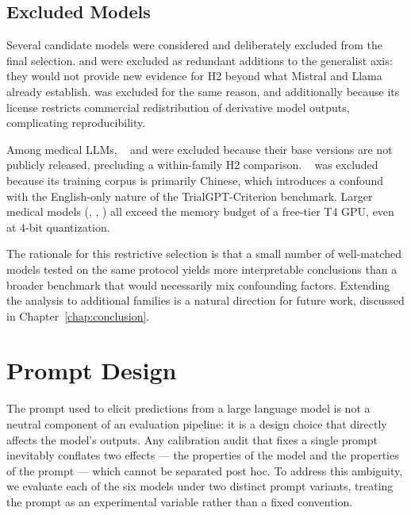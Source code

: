 \subsection{Excluded Models}
\label{subsec:met-excluded}

Several candidate models were considered and deliberately excluded from the 
final selection.  and  were 
excluded as redundant additions to the generalist axis: they would not 
provide new evidence for H2 beyond what Mistral and Llama already establish. 
 was excluded for the same reason, and additionally 
because its license restricts commercial redistribution of derivative 
model outputs, complicating reproducibility.

Among medical LLMs, ~\cite{christophe2024med42} and 
 were excluded because their base versions are not 
publicly released, precluding a within-family H2 comparison. 
~\cite{chen2024huatuogpt} was excluded because its 
training corpus is primarily Chinese, which introduces a confound with the 
English-only nature of the TrialGPT-Criterion benchmark. Larger medical 
models (, , ) all 
exceed the memory budget of a free-tier T4 GPU, even at 4-bit quantization.

The rationale for this restrictive selection is that a small number of 
well-matched models tested on the same protocol yields more interpretable 
conclusions than a broader benchmark that would necessarily mix confounding 
factors. Extending the analysis to additional families is a natural 
direction for future work, discussed in Chapter~\ref{chap:conclusion}.
\section{Prompt Design}
\label{sec:met-prompts}

The prompt used to elicit predictions from a large language model is not a 
neutral component of an evaluation pipeline: it is a design choice that 
directly affects the model's outputs. Any calibration audit that fixes a 
single prompt inevitably conflates two effects --- the properties of the 
model and the properties of the prompt --- which cannot be separated post 
hoc. To address this ambiguity, we evaluate each of the six models under 
two distinct prompt variants, treating the prompt as an experimental variable 
rather than a fixed convention.

